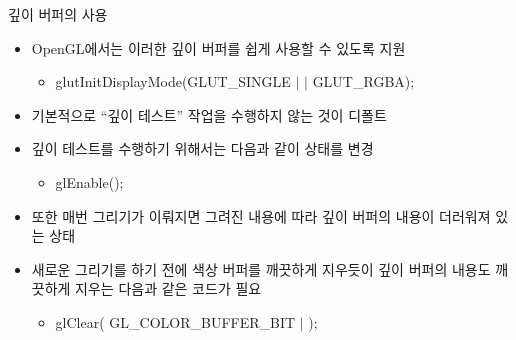 \documentclass{beamer}
\begin{document}
\begin{frame}[fragile]{깊이 버퍼의 사용}

{\small
\begin{itemize}
\item OpenGL에서는 이러한 깊이 버퍼를 쉽게 사용할 수 있도록 지원
	\begin{itemize}
	\item{\sf glutInitDisplayMode(GLUT\_SINGLE $|$ \color{red}{GLUT\_DEPTH} $|$ GLUT\_RGBA);}
	\end{itemize}
\end{itemize}

\begin{itemize}
\item 기본적으로 “깊이 테스트” 작업을 수행하지 않는 것이 디폴트
\item 깊이 테스트를 수행하기 위해서는 다음과 같이 상태를 변경
	\begin{itemize}
	\item{\sf glEnable(\color{red}{GL\_DEPTH\_TEST});}
	\end{itemize}
\end{itemize}



\begin{itemize}
\item 또한 매번 그리기가 이뤄지면 그려진 내용에 따라 깊이 버퍼의 내용이 더러워져 있는 상태
\item 새로운 그리기를 하기 전에 색상 버퍼를 깨끗하게 지우듯이 깊이 버퍼의 내용도 깨끗하게 지우는 다음과 같은 코드가 필요
	\begin{itemize}
	\item{\sf glClear( GL\_COLOR\_BUFFER\_BIT $|$ \color{red}{GL\_DEPTH\_BUFFER\_BIT});}
	\end{itemize}
\end{itemize}
}


\end{frame}
\end{document}
